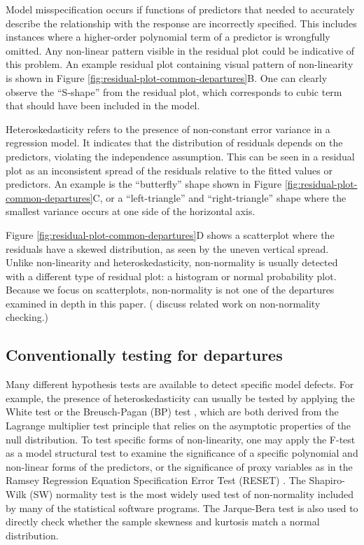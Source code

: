 \documentclass[]{interact}
\theoremstyle{plain}%
\theoremstyle{definition}
\theoremstyle{remark}
\begin{document}
Model misspecification occurs if functions of predictors that needed to
accurately describe the relationship with the response are incorrectly
specified. This includes instances where a higher-order polynomial term
of a predictor is wrongfully omitted. Any non-linear pattern visible in
the residual plot could be indicative of this problem. An example
residual plot containing visual pattern of non-linearity is shown in
Figure \ref{fig:residual-plot-common-departures}B. One can clearly
observe the ``S-shape'' from the residual plot, which corresponds to
cubic term that should have been included in the model.

Heteroskedasticity refers to the presence of non-constant error variance
in a regression model. It indicates that the distribution of residuals
depends on the predictors, violating the independence assumption. This
can be seen in a residual plot as an inconsistent spread of the
residuals relative to the fitted values or predictors. An example is the
``butterfly'' shape shown in Figure
\ref{fig:residual-plot-common-departures}C, or a ``left-triangle'' and
``right-triangle'' shape where the smallest variance occurs at one side
of the horizontal axis.

Figure \ref{fig:residual-plot-common-departures}D shows a scatterplot
where the residuals have a skewed distribution, as seen by the uneven
vertical spread. Unlike non-linearity and heteroskedasticity,
non-normality is usually detected with a different type of residual
plot: a histogram or normal probability plot. Because we focus on
scatterplots, non-normality is not one of the departures examined in
depth in this paper. (\citet{loy2016variations} discuss related work on
non-normality checking.)

\hypertarget{conventionally-testing-for-departures}{%
\subsection{Conventionally testing for
departures}\label{conventionally-testing-for-departures}}

Many different hypothesis tests are available to detect specific model
defects. For example, the presence of heteroskedasticity can usually be
tested by applying the White test \citep{white1980heteroskedasticity} or
the Breusch-Pagan (BP) test \citep{breusch1979simple}, which are both
derived from the Lagrange multiplier test \citep{silvey1959lagrangian}
principle that relies on the asymptotic properties of the null
distribution. To test specific forms of non-linearity, one may apply the
F-test as a model structural test to examine the significance of a
specific polynomial and non-linear forms of the predictors, or the
significance of proxy variables as in the Ramsey Regression Equation
Specification Error Test (RESET) \citep{ramsey1969tests}. The
Shapiro-Wilk (SW) normality test \citep{shapiro1965analysis} is the most
widely used test of non-normality included by many of the statistical
software programs. The Jarque-Bera test \citep{jarque1980efficient} is
also used to directly check whether the sample skewness and kurtosis
match a normal distribution.
\end{document}
